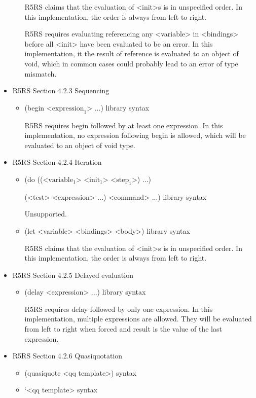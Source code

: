 \documentclass{article}
\begin{document}
\begin{itemize}
\begin{itemize}
		R5RS claims that the evaluation of <init>s is in unspecified order. In this implementation, the order is always from left to right.
		
		R5RS requires evaluating referencing any <variable> in <bindings> before all <init> have been evaluated to be an error. In this implementation, it the result of reference is evaluated to an object of void, which in common cases could probably lead to an error of type mismatch.
	\end{itemize}
	
\item R5RS Section 4.2.3 Sequencing
	\begin{itemize}
		\item (begin <$\textrm{expression}_1$> ...)	\hfill	library syntax
		
		R5RS requires begin followed by at least one expression. In this implementation, no expression following begin is allowed, which will be evaluated to an object of void type.
	\end{itemize}
	
\item R5RS Section 4.2.4 Iteration
	\begin{itemize}
		\item (do ((<$\textrm{variable}_1$> <$\textrm{init}_1$> <$\textrm{step}_1$>) ...)
		
			  \qquad (<test> <expression> ...)
			   <command> ...)	\hfill library syntax
			   
		Unsupported.
		
		\item (let <variable> <bindings> <body>)	\hfill	library syntax
		
		R5RS claims that the evaluation of <init>s is in unspecified order. In this implementation, the order is always from left to right.
	\end{itemize}
	
\item R5RS Section 4.2.5 Delayed evaluation
	\begin{itemize}
		\item (delay <expression> ...)	\hfill	library syntax
		
		R5RS requires delay followed by only one expression. In this implementation, multiple expressions are allowed. They will be evaluated from left to right when forced and result is the value of the last expression.
	\end{itemize}
	
\item R5RS Section 4.2.6 Quasiquotation
	\begin{itemize}
		\item (quasiquote <qq template>)	\hfill	syntax
		\item `<qq template>	\hfill	syntax
	\end{itemize}
	

\end{itemize}
\end{document}
